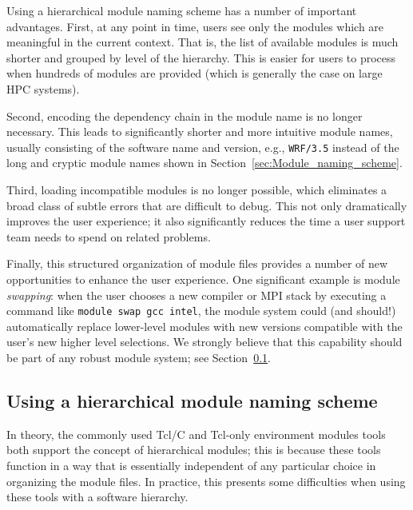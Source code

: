 
Using a hierarchical module naming scheme has a number of important
advantages. First, at any point in time, users see only the
modules which are meaningful in the current context. That is, the list of
available modules is much shorter and grouped by level of the hierarchy. This is easier for users to process when hundreds of modules are
provided (which is generally the case on large HPC systems).

Second, encoding the dependency chain in the module name is no longer
necessary. This leads to significantly shorter and more intuitive
module names, usually consisting of the software name and version, e.g.,
\texttt{\small WRF/3.5} instead of the long and cryptic module names shown in
Section~\ref{sec:Module_naming_scheme}.

Third, loading incompatible
modules is no longer possible, which eliminates a broad class of subtle errors that
are difficult to debug. This not only dramatically improves the user experience; it
also significantly reduces the time a user support team needs to spend on related
problems.

Finally, this structured organization of module files provides
a number of new opportunities to enhance the user experience. One significant
example is module \emph{swapping}: when the user chooses a new compiler or MPI
stack by executing a command like \texttt{\small module swap gcc intel}, the module
system could (and should!) automatically replace lower-level modules with new
versions compatible with the user's new higher level selections. We strongly believe
that this capability should be part of any robust module system; see
Section~\ref{sec:using_a_hierarchy}.


\subsection{Using a hierarchical module naming scheme}
\label{sec:using_a_hierarchy}

In theory, the commonly used Tcl/C and Tcl-only environment modules tools
both support the concept of hierarchical modules; this is because these tools function in a way that is essentially independent of any particular choice in organizing the module files. In practice, this presents some difficulties when using these tools with a software hierarchy.


